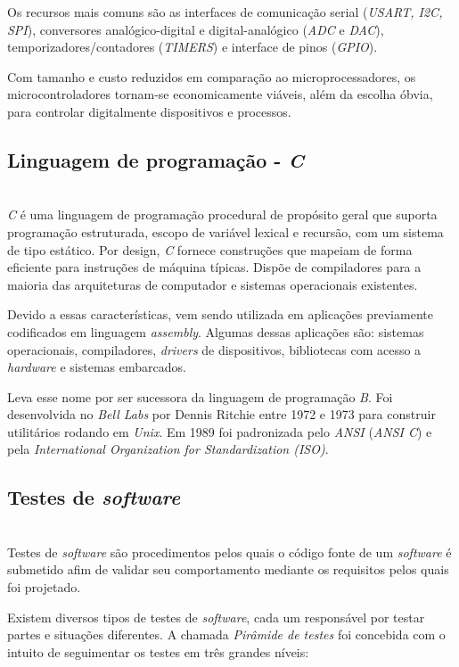 \documentclass[times, twoside, watermark]{artigo}
\begin{document}
Os recursos mais comuns são as interfaces de comunicação
serial (\textit{USART, I2C, SPI}), conversores analógico-digital e digital-analógico
(\textit{ADC} e \textit{DAC}), temporizadores/contadores (\textit{TIMERS}) e
interface de pinos (\textit{GPIO}).

Com tamanho e custo reduzidos em comparação ao microprocessadores,
os microcontroladores tornam-se economicamente viáveis, além da
escolha óbvia, para controlar digitalmente dispositivos e
processos\cite{gridling2007introduction}.


\subsection{Linguagem de programação - \textit{C}}\hfill\\

\textit{C} é uma linguagem de programação procedural de propósito geral que
suporta programação estruturada, escopo de variável lexical e recursão, com um
sistema de tipo estático. Por design, \textit{C} fornece construções que mapeiam de
forma eficiente para instruções de máquina típicas. Dispõe de compiladores para a
maioria das arquiteturas de computador e sistemas operacionais
existentes.\cite{ritchie1993development}

Devido a essas características, vem  sendo utilizada em aplicações previamente
codificados em linguagem \textit{assembly}.
Algumas dessas aplicações são: sistemas operacionais, compiladores,
\textit{drivers} de dispositivos, bibliotecas com acesso a \textit{hardware} e
sistemas embarcados.

Leva esse nome por ser sucessora da linguagem de programação \textit{B}.
Foi desenvolvida no \textit{Bell Labs} por Dennis Ritchie entre 1972 e 1973 para
construir utilitários rodando em \textit{Unix}.
Em 1989 foi padronizada pelo \textit{ANSI} (\textit{ANSI C}) e pela
\textit{International Organization for Standardization (ISO)}.
\cite{ritchie1993development}

\subsection{Testes de \textit{software}}\hfill\\

Testes de \textit{software} são procedimentos pelos quais o código fonte de um
\textit{software} é submetido afim de validar seu comportamento mediante
os requisitos pelos quais foi projetado.

Existem diversos tipos de testes de \textit{software}, cada um responsável por
testar partes e situações diferentes. A chamada \textit{Pirâmide de testes}
\cite{contan2018test} foi concebida com o intuito de seguimentar os testes em três
grandes níveis:
\end{document}
